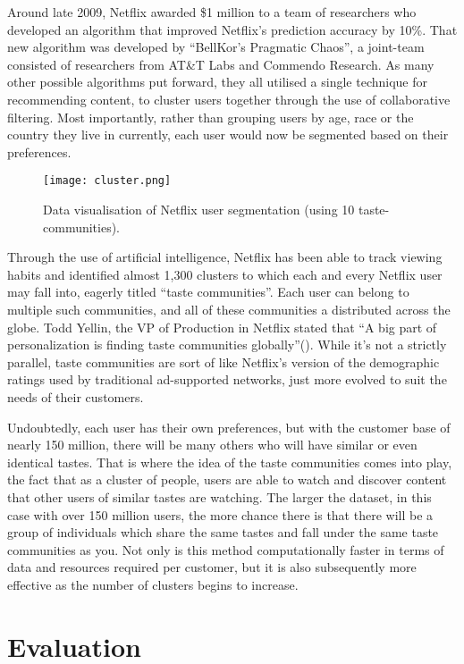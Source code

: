 \documentclass[12pt,a4paper]{article}
\begin{document}
Around late 2009, Netflix awarded \$1 million to a team of researchers who developed an algorithm that improved Netflix’s prediction accuracy by 10\%. That new algorithm was developed by \enquote{BellKor's Pragmatic Chaos}, a joint-team consisted of researchers from AT\&T Labs and Commendo Research. As many other possible algorithms put forward, they all utilised a single technique for recommending content, to cluster users together through the use of collaborative filtering. Most importantly, rather than grouping users by age, race or the country they live in currently, each user would now be segmented based on their preferences.

\begin{figure}[H]
	\centering
	\texttt{[image: cluster.png]}
	\caption{Data visualisation of Netflix user segmentation (using 10 taste-communities).}
\end{figure}

Through the use of artificial intelligence, Netflix has been able to track viewing habits and identified almost 1,300 clusters to which each and every Netflix user may fall into, eagerly titled \enquote{taste communities}. Each user can belong to multiple such communities, and all of these communities a distributed across the globe. Todd Yellin, the VP of Production in Netflix stated that “A big part of personalization is finding taste communities globally”(\cite{hafford}). While it’s not a strictly parallel, taste communities are sort of like Netflix’s version of the demographic ratings used by traditional ad-supported networks, just more evolved to suit the needs of their customers.

Undoubtedly, each user has their own preferences, but with the customer base of nearly 150 million, there will be many others who will have similar or even identical tastes. That is where the idea of the taste communities comes into play, the fact that as a cluster of people, users are able to watch and discover content that other users of similar tastes are watching. The larger the dataset, in this case with over 150 million users, the more chance there is that there will be a group of individuals which share the same tastes and fall under the same taste communities as you. Not only is this method computationally faster in terms of data and resources required per customer, but it is also subsequently more effective as the number of clusters begins to increase.

\section{Evaluation}
\end{document}

